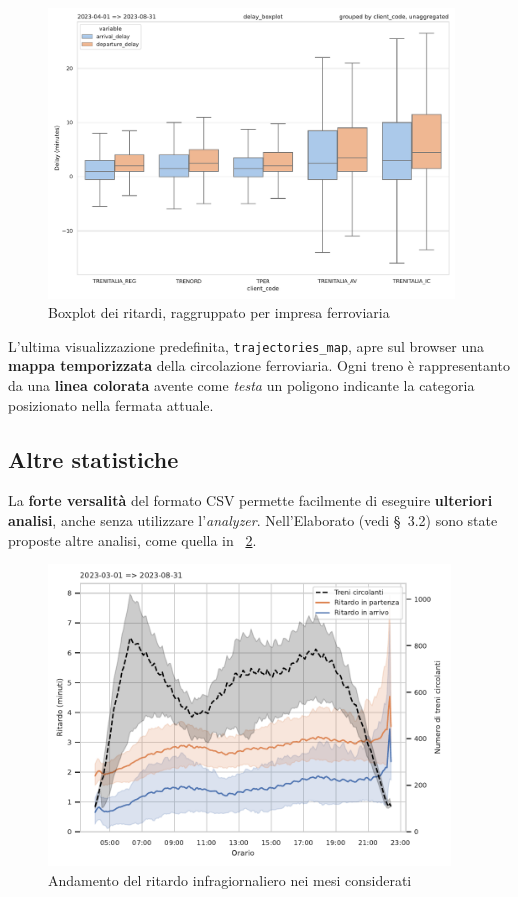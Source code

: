 \documentclass[italian]{article}
\begin{document}
\begin{figure}[h]
    \centering
    \includegraphics[width=0.96\textwidth]{images/delay_box_rc.pdf}
    \caption{Boxplot dei ritardi, raggruppato per impresa ferroviaria}
    \label{figure:delay_box_rc}
\end{figure}

L'ultima visualizzazione predefinita, \texttt{trajectories\_map}, apre
sul browser una \textbf{mappa temporizzata} della circolazione
ferroviaria.  Ogni treno è rappresentanto da una \textbf{linea
    colorata} avente come \textit{testa} un poligono indicante la
categoria posizionato nella fermata attuale.

\subsection*{Altre statistiche}

La \textbf{forte versalità} del formato CSV permette facilmente di
eseguire \textbf{ulteriori analisi}, anche senza utilizzare
l'\textit{analyzer}.  Nell'Elaborato (vedi \S~3.2) sono state proposte
altre analisi, come quella in \figurename~\ref{figure:intraday}.

\begin{figure}[h]
    \centering
    \includegraphics[width=0.95\textwidth]{images/intraday_delay.pdf}
    \caption{Andamento del ritardo infragiornaliero nei mesi considerati}
    \label{figure:intraday}
\end{figure}
\end{document}

